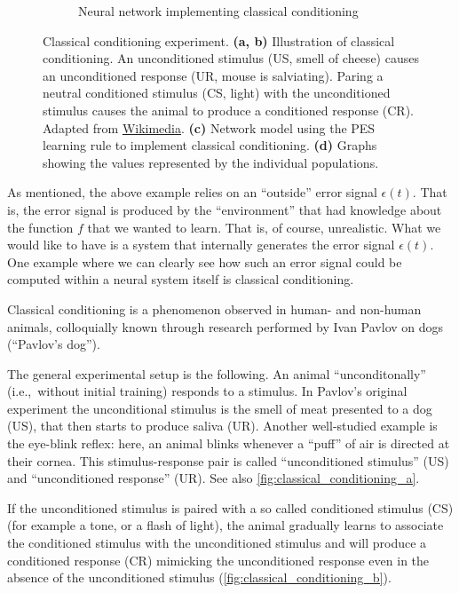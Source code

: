 \documentclass[10pt,letterpaper,oneside]{article}
\begin{document}
\begin{figure}[p]
\begin{subfigure}{\textwidth}
		\caption{Neural network implementing classical conditioning}
		\label{fig:classical_conditioning_experiment}
	\end{subfigure}
	\caption{Classical conditioning experiment. \textbf{(a, b)} Illustration of classical conditioning. An unconditioned stimulus (US, smell of cheese) causes an unconditioned response (UR, mouse is salviating). Paring a neutral conditioned stimulus (CS, light) with the unconditioned stimulus causes the animal to produce a conditioned response (CR). Adapted from \href{https://commons.wikimedia.org/wiki/File:Classical_conditioning_-_extinction.svg}{Wikimedia}. \textbf{(c)} Network model using the PES learning rule to implement classical conditioning.  \textbf{(d)} Graphs showing the values represented by the individual populations.}
	\label{fig:classical_conditioning}
\end{figure}

As mentioned, the above example relies on an \enquote{outside} error signal $\epsilon(t)$. That is, the error signal is produced by the \enquote{environment} that had knowledge about the function $f$ that we wanted to learn. That is, of course, unrealistic. What we would like to have is a system that internally generates the error signal $\epsilon(t)$. One example where we can clearly see how such an error signal could be computed within a neural system itself is classical conditioning.

Classical conditioning is a phenomenon observed in human- and non-human animals, colloquially known through research performed by Ivan Pavlov on dogs (\enquote{Pavlov's dog}).

The general experimental setup is the following. An animal \enquote{unconditonally} (i.e.,~without initial training) responds to a stimulus. In Pavlov's original experiment the unconditional stimulus is the smell of meat presented to a dog (US), that then starts to produce saliva (UR). Another well-studied example is the eye-blink reflex: here, an animal blinks whenever a \enquote{puff} of air is directed at their cornea. This stimulus-response pair is called \enquote{unconditioned stimulus} (US) and \enquote{unconditioned response} (UR). See also \cref{fig:classical_conditioning_a}.

If the unconditioned stimulus is paired with a so called conditioned stimulus (CS) (for example a tone, or a flash of light), the animal gradually learns to associate the conditioned stimulus with the unconditioned stimulus and will produce a conditioned response (CR) mimicking the unconditioned response even in the absence of the unconditioned stimulus (\cref{fig:classical_conditioning_b}).
\end{document}
